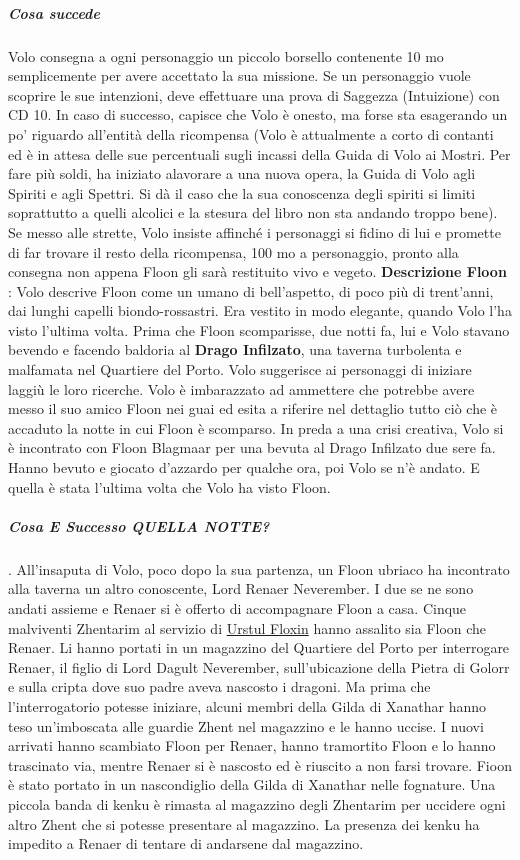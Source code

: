 \documentclass{article}
\begin{document}
\subparagraph{Cosa succede} Volo consegna a ogni personaggio un piccolo borsello
contenente 10 mo semplicemente per avere accettato
la sua missione. Se un personaggio vuole scoprire le
sue intenzioni, deve effettuare una prova di Saggezza
(Intuizione) con CD 10. In caso di successo, capisce che
Volo è onesto, ma forse sta esagerando un po' riguardo
all'entità della ricompensa (Volo è attualmente a corto di
contanti ed è in attesa delle sue percentuali sugli incassi
della Guida di Volo ai Mostri. Per fare più soldi, ha iniziato
alavorare a una nuova opera, la Guida di Volo agli Spiriti e
agli Spettri. Si dà il caso che la sua conoscenza degli spiriti
si limiti soprattutto a quelli alcolici e la stesura del libro non
sta andando troppo bene). Se messo alle strette, Volo insiste
affinché i personaggi si fidino di lui e promette di far trovare
il resto della ricompensa, 100 mo a personaggio, pronto alla
consegna non appena Floon gli sarà restituito vivo e vegeto.
\textbf{Descrizione Floon} : Volo descrive Floon come un umano di bell'aspetto, di
poco più di trent'anni, dai lunghi capelli biondo-rossastri.
Era vestito in modo elegante, quando Volo l’ha visto l’ultima
volta. Prima che Floon scomparisse, due notti fa, lui e Volo
stavano bevendo e facendo baldoria al \textbf{Drago Infilzato}, una
taverna turbolenta e malfamata nel Quartiere del Porto. Volo
suggerisce ai personaggi di iniziare laggiù le loro ricerche. 
Volo è imbarazzato ad ammettere che potrebbe avere
messo il suo amico Floon nei guai ed esita a riferire nel
dettaglio tutto ciò che è accaduto la notte in cui Floon è
scomparso. In preda a una crisi creativa, Volo si è incontrato con
Floon Blagmaar per una bevuta al Drago Infilzato due sere
fa. Hanno bevuto e giocato d'azzardo per qualche ora, poi
Volo se n'è andato. E quella è stata l'ultima volta che Volo
ha visto Floon.

\subparagraph{Cosa E Successo QUELLA NOTTE?} .
All’insaputa di Volo, poco dopo la sua partenza, un Floon
ubriaco ha incontrato alla taverna un altro conoscente,
Lord Renaer Neverember. I due se ne sono andati assieme
e Renaer si è offerto di accompagnare Floon a casa. Cinque
malviventi Zhentarim al servizio di \hyperlink{urstul}{Urstul Floxin}  hanno assalito sia Floon che Renaer. Li
hanno portati in un magazzino del Quartiere del Porto per
interrogare Renaer, il figlio di Lord Dagult Neverember,
sull’ubicazione della Pietra di Golorr e sulla cripta dove suo
padre aveva nascosto i dragoni. Ma prima che l'interrogatorio
potesse iniziare, alcuni membri della Gilda di Xanathar
hanno teso un'imboscata alle guardie Zhent nel magazzino e
le hanno uccise. I nuovi arrivati hanno scambiato Floon per
Renaer, hanno tramortito Floon e lo hanno trascinato via,
mentre Renaer si è nascosto ed è riuscito a non farsi trovare.
Fioon è stato portato in un nascondiglio della Gilda di
Xanathar nelle fognature. Una piccola banda di kenku è
rimasta al magazzino degli Zhentarim per uccidere ogni
altro Zhent che si potesse presentare al magazzino. La
presenza dei kenku ha impedito a Renaer di tentare di
andarsene dal magazzino.
\end{document}
